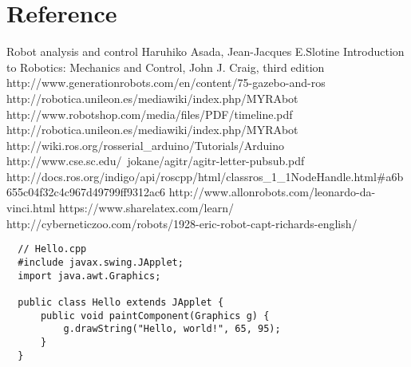 \documentclass[pdftex,12pt,a4paper]{article}
\begin{document}
  \section{Reference}
  Robot analysis and control Haruhiko Asada, Jean-Jacques E.Slotine
  Introduction to Robotics: Mechanics and Control, John J. Craig, third edition
  http://www.generationrobots.com/en/content/75-gazebo-and-ros
  http://robotica.unileon.es/mediawiki/index.php/MYRAbot%
  http://www.robotshop.com/media/files/PDF/timeline.pdf
  http://robotica.unileon.es/mediawiki/index.php/MYRAbot%
  http://wiki.ros.org/rosserial_arduino/Tutorials/Arduino%
  http://www.cse.sc.edu/~jokane/agitr/agitr-letter-pubsub.pdf
  http://docs.ros.org/indigo/api/roscpp/html/classros_1_1NodeHandle.html#a6b655c04f32c4c967d49799ff9312ac6
  http://www.allonrobots.com/leonardo-da-vinci.html
  https://www.sharelatex.com/learn/
  http://cyberneticzoo.com/robots/1928-eric-robot-capt-richards-english/
  \begin{lstlisting}
  // Hello.cpp
  #include javax.swing.JApplet;
  import java.awt.Graphics;
  
  public class Hello extends JApplet {
	  public void paintComponent(Graphics g) {
          g.drawString("Hello, world!", 65, 95);
      }    
  }
  \end{lstlisting}
  
\end{document}
